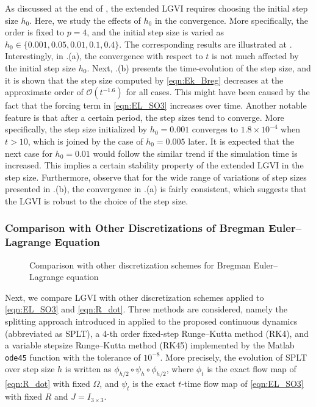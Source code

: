 \documentclass[letterpaper, 10pt, conference]{ieeeconf}
\begin{document}
As discussed at the end of , the extended LGVI requires choosing the initial step size $h_0$. 
Here, we study the effects of $h_0$ in the convergence.
More specifically, the order is fixed to $p=4$, and the initial step size is varied as $h_0\in\{0.001, 0.05, 0.01, 0.1, 0.4\}$.
The corresponding results are illustrated at .
Interestingly, in .(a), the convergence with respect to $t$ is not much affected by the initial step size $h_0$.
Next, .(b) presents the time-evolution of the step size, and it is shown that the step size computed by \eqref{eqn:Ek_Breg} decreases at the approximate order of $\mathcal{O}(t^{-1.6})$  for all cases. 
This might have been caused by the fact that the forcing term in \eqref{eqn:EL_SO3} increases over time.
Another notable feature is that after a certain period, the step sizes tend to converge. 
More specifically, the step size initialized by $h_0=0.001$ converges to $1.8\times 10^{-4}$ when $t>10$, which is joined by the case of $h_0=0.005$ later. 
It is expected that the next case for $h_0=0.01$ would follow the similar trend if the simulation time is increased.
This implies a certain stability property of the extended LGVI in the step size.
Furthermore, observe that for the wide range of variations of step sizes presented in .(b), the convergence in .(a) is fairly consistent, which suggests that the LGVI is robust to the choice of the step size. 

\subsubsection{Comparison with Other Discretizations of Bregman Euler--Lagrange Equation}

\begin{figure}
    \centerline{
    }
    \centerline{
    }
    \caption{Comparison with other discretization schemes for Bregman Euler--Lagrange equation}\label{fig:comp_disc}
\end{figure}

Next, we compare LGVI with other discretization schemes applied to \eqref{eqn:EL_SO3} and \eqref{eqn:R_dot}.
Three methods are considered, namely the splitting approach introduced in \cite{tao2020variational} applied to the proposed continuous dynamics (abbreviated as SPLT), a 4-th order fixed-step Runge--Kutta method (RK4), and a variable stepsize Runge--Kutta method (RK45) implemented by the Matlab \texttt{ode45} function with the tolerance of $10^{-8}$. 
More precisely, the evolution of SPLT over step size $h$ is written as $\phi_{h/2} \circ \psi_h \circ \phi_{h/2}$, where $\phi_t$ is the exact flow map of \eqref{eqn:R_dot} with fixed $\Omega$, and $\psi_t$ is the exact $t$-time flow map of \eqref{eqn:EL_SO3} with fixed $R$ and $J=I_{3\times 3}$.
\end{document}
